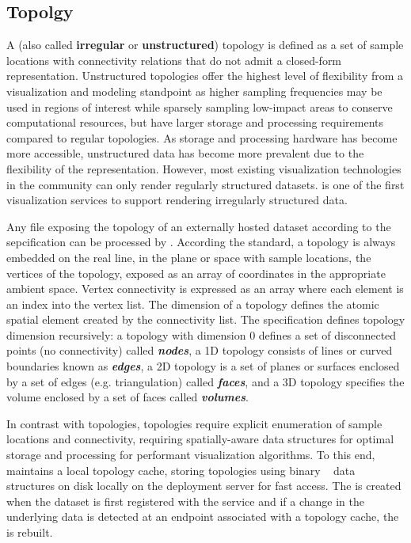 \subsection{\ugrid{} Topolgy}
\label{sec:ugrid}
A \ugrid{} (also called {\bf irregular} or {\bf unstructured})
topology is defined as a set of sample locations with connectivity
relations that do not admit a closed-form representation. Unstructured
topologies offer the highest level of flexibility from a visualization
and modeling standpoint as higher sampling frequencies may be used in
regions of interest while sparsely sampling low-impact areas to
conserve computational resources, but have larger storage and
processing requirements compared to regular topologies. As storage and
processing hardware has become more accessible, unstructured data has
become more prevalent due to the flexibility of the
representation. However, most existing visualization technologies in
the \cf{} community can only render regularly structured
datasets. \sciwms{} is one of the first visualization services to
support rendering irregularly structured data.

Any \ncml{} file exposing the topology of an externally hosted dataset
according to the \cfugrid{} sepcification can be processed by
\sciwms{}. According the \cfugrid{} standard, a topology is always
embedded on the real line, in the plane or space with sample
locations, the vertices of the topology, exposed as an array of
coordinates in the appropriate ambient space. Vertex connectivity is
expressed as an array where each element is an index into the vertex
list. The dimension of a topology defines the atomic spatial element
created by the connectivity list. The \cfugrid{} specification defines
topology dimension recursively: a topology with dimension 0 defines a
set of disconnected points (no connectivity) called
\textbf{\textit{nodes}}, a 1D topology consists of lines or curved
boundaries known as \textbf{\textit{edges}}, a 2D topology is a set of
planes or surfaces enclosed by a set of edges (e.g. triangulation)
called \textbf{\textit{faces}}, and a 3D topology specifies the volume
enclosed by a set of faces called \textbf{\textit{volumes}}.

In contrast with \cgrid{} topologies, \ugrid{} topologies require
explicit enumeration of sample locations and connectivity, requiring
spatially-aware data structures for optimal storage and processing for
performant visualization algorithms. To this end, \sciwms{} maintains
a local topology cache, storing \ugrid{} topologies using binary
\rtree{}~\cite{Guttman84} data structures on disk locally on the
deployment server for fast access. The \rtree{} is created when the
dataset is first registered with the \sciwms{} service and if a change
in the underlying data is detected at an endpoint associated with a
topology cache, the \rtree{} is rebuilt.
